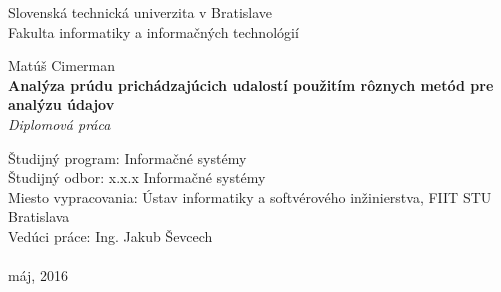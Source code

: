 \documentclass[12pt, a4paper, titlepage, slovak]{book}
\begin{document}
\begin{titlepage}
\begin{center}                                                                                                                                                   
{\Large Slovenská technická univerzita v Bratislave} \\
{\Large Fakulta informatiky a informačných technológií} \\
\vspace*{1\baselineskip}
\large {}
\vfill %


{{Matúš Cimerman}} \\
\vspace*{1\baselineskip}
{\LARGE {\textbf{Analýza prúdu prichádzajúcich udalostí použitím rôznych metód pre analýzu údajov}}} %
\\
\vspace*{1\baselineskip}
\textit{Diplomová práca}\\
\vfill %
\end{center}
{Študijný program: Informačné systémy}\\
{Študijný odbor: x.x.x Informačné systémy}\\
{Miesto vypracovania: Ústav informatiky a softvérového inžinierstva, FIIT STU Bratislava}\\
{Vedúci práce: Ing. Jakub Ševcech}\\
\\
{máj, 2016}

\end{titlepage}
\restoregeometry
\thispagestyle{empty}
\emptydoublepage

%



\emptydoublepage


\emptydoublepage

%

\renewcommand{\contentsname}{Obsah}
\singlespacing
\tableofcontents
\end{document}
